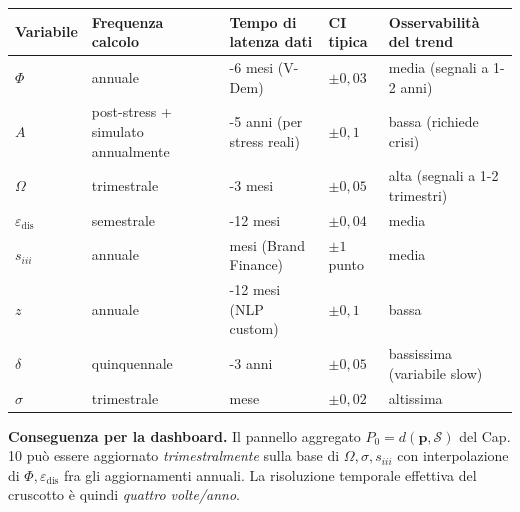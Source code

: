 {\def\LTcaptype{none} %
{\small\begin{longtable}[]{@{}
  >{\raggedright\arraybackslash}p{}
  >{\raggedright\arraybackslash}p{}
  >{\raggedright\arraybackslash}p{}
  >{\raggedright\arraybackslash}p{}
  >{\raggedright\arraybackslash}p{}@{}}
\toprule\noalign{}
\begin{minipage}[b]{\linewidth}\raggedright
Variabile
\end{minipage} & \begin{minipage}[b]{\linewidth}\raggedright
Frequenza calcolo
\end{minipage} & \begin{minipage}[b]{\linewidth}\raggedright
Tempo di latenza dati
\end{minipage} & \begin{minipage}[b]{\linewidth}\raggedright
CI tipica
\end{minipage} & \begin{minipage}[b]{\linewidth}\raggedright
Osservabilità del trend
\end{minipage} \\
\midrule\noalign{}
\endhead
\bottomrule\noalign{}
\endlastfoot
\(\Phi\) & annuale & 4-6 mesi (V-Dem) & \(\pm 0{,}03\) & media (segnali
a 1-2 anni) \\
\(A\) & post-stress + simulato annualmente & 3-5 anni (per stress reali)
& \(\pm 0{,}1\) & bassa (richiede crisi) \\
\(\Omega\) & trimestrale & 2-3 mesi & \(\pm 0{,}05\) & alta (segnali a
1-2 trimestri) \\
\(\varepsilon_{\text{dis}}\) & semestrale & 6-12 mesi & \(\pm 0{,}04\) &
media \\
\(s_{iii}\) & annuale & 3 mesi (Brand Finance) & \(\pm 1\) punto &
media \\
\(z\) & annuale & 6-12 mesi (NLP custom) & \(\pm 0{,}1\) & bassa \\
\(\delta\) & quinquennale & 1-3 anni & \(\pm 0{,}05\) & bassissima
(variabile slow) \\
\(\sigma\) & trimestrale & 1 mese & \(\pm 0{,}02\) & altissima \\
\end{longtable}}
}

\Hypoth{} \textbf{Conseguenza per la dashboard.} Il pannello aggregato
\(P_0 = d(\boldsymbol{p}, \mathcal{S})\) del Cap. 10 può essere
aggiornato \emph{trimestralmente} sulla base di
\(\Omega, \sigma, s_{iii}\) con interpolazione di
\(\Phi, \varepsilon_{\text{dis}}\) fra gli aggiornamenti annuali. La
risoluzione temporale effettiva del cruscotto è quindi \emph{quattro
volte/anno}.



